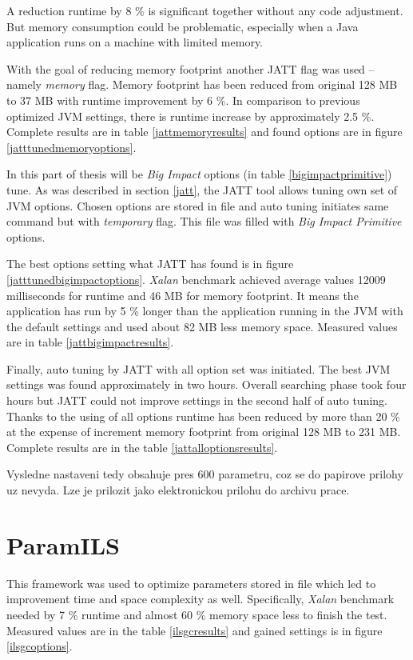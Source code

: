 \documentclass[
  digital, %
  oneside,
  notable, %
  nolof,     %
  nolot     %
]{fithesis3}
\begin{document}
A reduction runtime by 8 \% is significant together without any code adjustment. But memory consumption could be problematic, especially when a Java application runs on a machine with limited memory.

With the goal of reducing memory footprint another JATT flag was used -- namely \textit{memory} flag. Memory footprint has been reduced from original 128 MB to 37 MB with runtime improvement by 6 \%. In comparison to previous optimized JVM settings, there is runtime increase by approximately 2.5 \%.  Complete results are in table \ref{jattmemoryresults} and found options are in figure \ref{jatttunedmemoryoptions}.

In this part of thesis will be \textit{Big Impact} options (in table \ref{bigimpactprimitive}) tune. As was described in section \ref{jatt}, the JATT tool allows tuning own set of JVM options. Chosen options are stored in \texttt{} file and auto tuning initiates same command but with \textit{temporary} flag. This file was filled with \textit{Big Impact Primitive} options.

The best options setting what JATT has found is in figure \ref{jatttunedbigimpactoptions}. \textit{Xalan} benchmark achieved average values 12009 milliseconds for runtime and 46 MB for memory footprint. It means the application has run by 5 \% longer than the application running in the JVM with the default settings and used about 82 MB less memory space. Measured values are in table \ref{jattbigimpactresults}.

Finally, auto tuning by JATT with all option set was initiated. The best JVM settings was found approximately in two hours. Overall searching phase took four hours but JATT could not improve settings  in the second half of auto tuning. Thanks to the using of all options runtime has been reduced by more than 20 \% at the expense of increment memory footprint from original 128 MB to 231 MB. Complete results are in the table \ref{jattalloptionsresults}.

{\color{red} Vysledne nastaveni tedy obsahuje pres 600 parametru, coz se do papirove prilohy uz nevyda. Lze je prilozit jako elektronickou prilohu do archivu prace.}

\section{ParamILS}
This framework was used to optimize parameters stored in \texttt{} file which led to improvement time and space complexity as well. Specifically, \textit{Xalan} benchmark needed by 7 \% runtime and almost 60 \% memory space less to finish the test. Measured values are in the table \ref{ilsgcresults} and gained settings is in figure \ref{ilsgcoptions}.
\end{document}
